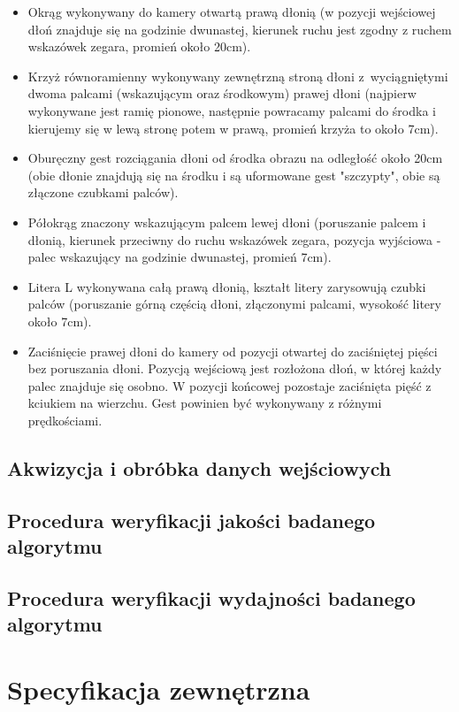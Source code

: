 \begin{itemize}
  \item Okrąg wykonywany do kamery otwartą prawą dłonią (w pozycji wejściowej dłoń znajduje się na godzinie dwunastej, kierunek ruchu jest zgodny z ruchem wskazówek zegara, promień około 20cm).
  \item Krzyż równoramienny wykonywany zewnętrzną stroną dłoni z~wyciągniętymi dwoma palcami (wskazującym oraz środkowym) prawej dłoni (najpierw wykonywane jest ramię pionowe, następnie powracamy palcami do środka i kierujemy się w lewą stronę potem w prawą, promień krzyża to około 7cm).
  \item Oburęczny gest rozciągania dłoni od środka obrazu na odległość około 20cm (obie dłonie znajdują się na środku i są uformowane gest "szczypty", obie są złączone czubkami palców).
  \item Półokrąg znaczony wskazującym palcem lewej dłoni (poruszanie palcem i dłonią, kierunek przeciwny do ruchu wskazówek zegara, pozycja wyjściowa - palec wskazujący na godzinie dwunastej, promień 7cm).
  \item Litera L wykonywana całą prawą dłonią, kształt litery zarysowują czubki palców (poruszanie górną częścią dłoni, złączonymi palcami, wysokość litery około 7cm).
  \item Zaciśnięcie prawej dłoni do kamery od pozycji otwartej do zaciśniętej pięści bez poruszania dłoni. Pozycją wejściową jest rozłożona dłoń, w której każdy palec znajduje się osobno. W pozycji końcowej pozostaje zaciśnięta pięść z kciukiem na wierzchu. Gest powinien być wykonywany z różnymi prędkościami.
\end{itemize}

\section{Akwizycja i obróbka danych wejściowych}\label{Section_DefinicjeGestow}

\section{Procedura weryfikacji jakości badanego algorytmu}\label{Section_Jakosc}

\section{Procedura weryfikacji wydajności badanego algorytmu}\label{Section_Wydajnosc}

\chapter{Specyfikacja zewnętrzna}\label{Chapter_SpecyfikacjaZewnetrzna}

